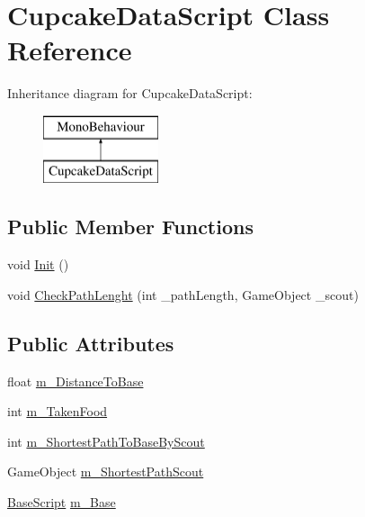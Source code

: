 \hypertarget{class_cupcake_data_script}{}\section{Cupcake\+Data\+Script Class Reference}
\label{class_cupcake_data_script}
Inheritance diagram for Cupcake\+Data\+Script\+:\begin{figure}[H]
\begin{center}
\leavevmode
\includegraphics[height=2.000000cm]{class_cupcake_data_script}
\end{center}
\end{figure}
\subsection*{Public Member Functions}
\begin{DoxyCompactItemize}
\item 
void \mbox{\hyperlink{class_cupcake_data_script_a891c6c00b3969f293c2896f34e1ad2c1}{Init}} ()
\item 
void \mbox{\hyperlink{class_cupcake_data_script_a02d3a1c9ce68a8d02d6343e43e697436}{Check\+Path\+Lenght}} (int \+\_\+path\+Length, Game\+Object \+\_\+scout)
\end{DoxyCompactItemize}
\subsection*{Public Attributes}
\begin{DoxyCompactItemize}
\item 
float \mbox{\hyperlink{class_cupcake_data_script_a7f9e2e066b42f6e585e07490f9fdbc44}{m\+\_\+\+Distance\+To\+Base}}
\item 
int \mbox{\hyperlink{class_cupcake_data_script_a8bd3a30e2e4dc0cba1927eaba7587152}{m\+\_\+\+Taken\+Food}}
\item 
int \mbox{\hyperlink{class_cupcake_data_script_a387db38cb4a2f80925befc299a64ca66}{m\+\_\+\+Shortest\+Path\+To\+Base\+By\+Scout}}
\item 
Game\+Object \mbox{\hyperlink{class_cupcake_data_script_ac562882a357853b3bc2ddd708b2ae466}{m\+\_\+\+Shortest\+Path\+Scout}}
\item 
\mbox{\hyperlink{class_base_script}{Base\+Script}} \mbox{\hyperlink{class_cupcake_data_script_a0362cf18940bafb31a5501f5b6f6698c}{m\+\_\+\+Base}}
\end{DoxyCompactItemize}


